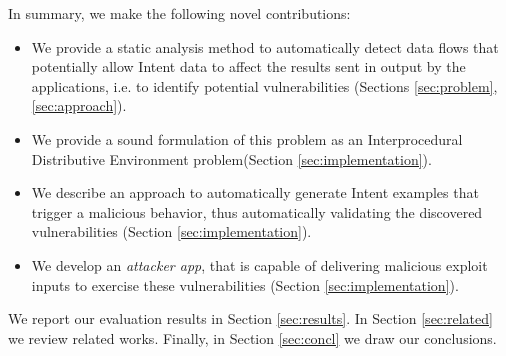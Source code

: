 In summary, we make the following novel contributions:
\begin{itemize}
 \item We provide a static analysis method to automatically detect data flows that potentially allow
 Intent data to affect the results sent in output by the applications, i.e. to identify potential vulnerabilities (Sections \ref{sec:problem}, \ref{sec:approach}). 
 \item We provide a sound formulation of this problem as an Interprocedural Distributive Environment problem(Section \ref{sec:implementation}).
 \item We describe an approach to automatically generate Intent examples that trigger a malicious behavior, thus automatically validating the discovered vulnerabilities (Section \ref{sec:implementation}).
 \item We develop an {\em attacker app}, that is capable of delivering malicious exploit inputs to exercise these vulnerabilities (Section \ref{sec:implementation}). 
\end{itemize}

We report our evaluation results in Section \ref{sec:results}. In Section \ref{sec:related} we review  related works. Finally, in Section \ref{sec:concl} we draw our conclusions.
